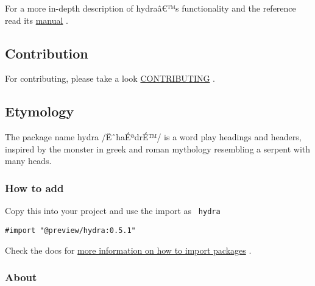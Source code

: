 For a more in-depth description of hydraâ€™s functionality and the
reference read its
\href{https://github.com/typst/packages/raw/main/packages/preview/hydra/0.5.1/doc/manual.pdf}{manual}
.

\subsection{Contribution}\label{contribution}

For contributing, please take a look
\href{https://github.com/typst/packages/raw/main/packages/preview/hydra/0.5.1/CONTRIBUTING.md}{CONTRIBUTING}
.

\subsection{Etymology}\label{etymology}

The package name hydra /ËˆhaÉªdrÉ™/ is a word play headings and headers,
inspired by the monster in greek and roman mythology resembling a
serpent with many heads.

\subsubsection{How to add}\label{how-to-add}

Copy this into your project and use the import as \texttt{\ hydra\ }

\begin{verbatim}
#import "@preview/hydra:0.5.1"
\end{verbatim}



Check the docs for
\href{https://typst.app/docs/reference/scripting/\#packages}{more
information on how to import packages} .

\subsubsection{About}\label{about}

